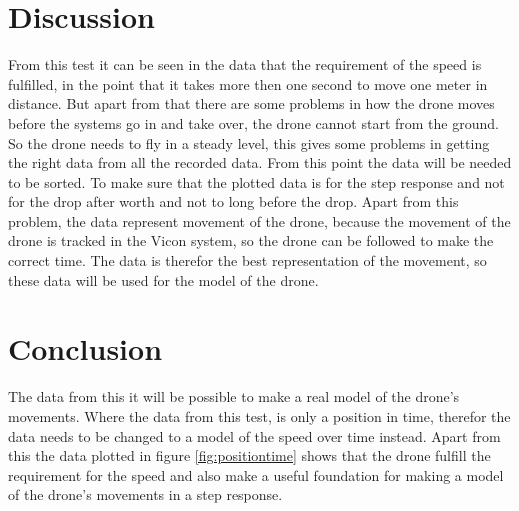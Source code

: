 \section*{Discussion}
From this test it can be seen in the data that the requirement of the speed is fulfilled, in the point that it takes more then one second to move one meter in distance. But apart from that there are some problems in how the drone moves before the systems go in and take over, the drone cannot start from the ground. So the drone needs to fly in a steady level, this gives some problems in getting the right data from all the recorded data. From this point the data will be needed to be sorted. To make sure that the plotted data is for the step response and not for the drop after worth and not to long before the drop. 
\newline
Apart from this problem, the data represent movement of the drone, because the movement of the drone is tracked in the Vicon system, so the drone can be followed to make the correct time. The data is therefor the best representation of the movement, so these data will be used for the model of the drone.

\section*{Conclusion}
The data from this it will be possible to make a real model of the drone's movements. Where the data from this test, is only a position in time, therefor the data needs to be changed to a model of the speed over time instead. Apart from this the data plotted in figure \ref{fig:positiontime} shows that the drone fulfill the requirement for the speed and also make a useful foundation for making a model of the drone's movements in a step response.





